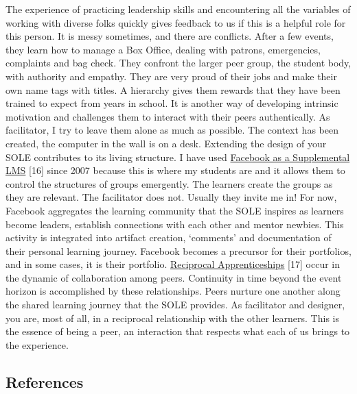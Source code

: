 The experience of practicing leadership skills and encountering all the
variables of working with diverse folks quickly gives feedback to us if
this is a helpful role for this person. It is messy sometimes, and there
are conflicts. After a few events, they learn how to manage a Box
Office, dealing with patrons, emergencies, complaints and bag check.
They confront the larger peer group, the student body, with authority
and empathy. They are very proud of their jobs and make their own name
tags with titles. A hierarchy gives them rewards that they have been
trained to expect from years in school. It is another way of developing
intrinsic motivation and challenges them to interact with their peers
authentically. As facilitator, I try to leave them alone as much as
possible. The context has been created, the computer in the wall is on a
desk. Extending the design of your SOLE contributes to its living
structure. I have used
\href{http://community.telecentre.org/profiles/blogs/facebook-as-a-supplemental-lms}{Facebook
as a Supplemental LMS} {[}16{]} since 2007 because this is where my
students are and it allows them to control the structures of groups
emergently. The learners create the groups as they are relevant. The
facilitator does not. Usually they invite me in! For now, Facebook
aggregates the learning community that the SOLE inspires as learners
become leaders, establish connections with each other and mentor
newbies. This activity is integrated into artifact creation, `comments'
and documentation of their personal learning journey. Facebook becomes a
precursor for their portfolios, and in some cases, it is their
portfolio.
\href{http://starwars.wikia.com/wiki/Reciprocal\_apprenticeship}{Reciprocal
Apprenticeships} {[}17{]} occur in the dynamic of collaboration among
peers. Continuity in time beyond the event horizon is accomplished by
these relationships. Peers nurture one another along the shared learning
journey that the SOLE provides. As facilitator and designer, you are,
most of all, in a reciprocal relationship with the other learners. This
is the essence of being a peer, an interaction that respects what each
of us brings to the experience.

\subsection{References}

